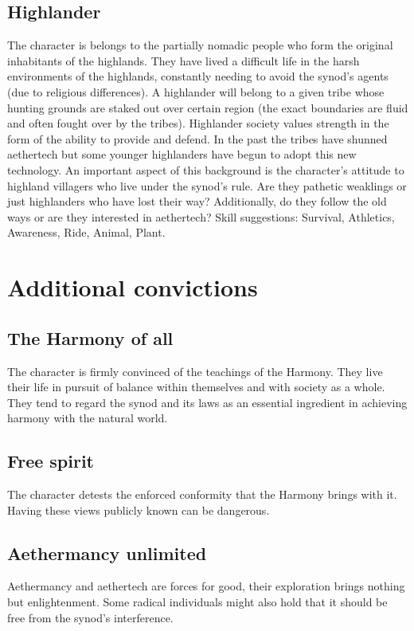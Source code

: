\documentclass[a4paper,11pt,oneside]{book}
\begin{document}
\subsection{Highlander}
The character is belongs to the partially nomadic people who form the original inhabitants of the highlands. They have lived a difficult life in the harsh environments of the highlands, constantly needing to avoid the synod's agents (due to religious differences). A highlander will belong to a given tribe whose hunting grounds are staked out over certain region (the exact boundaries are fluid and often fought over by the tribes). Highlander society values strength in the form of the ability to provide and defend. In the past the tribes have shunned aethertech but some younger highlanders have begun to adopt this new technology. An important aspect of this background is the character's attitude to highland villagers who live under the synod's rule. Are they pathetic weaklings or just highlanders who have lost their way? Additionally, do they follow the old ways or are they interested in aethertech? Skill suggestions: Survival, Athletics, Awareness, Ride, Animal, Plant.  


\section{Additional convictions}

\subsection{The Harmony of all}
The character is firmly convinced of the teachings of the Harmony. They live their life in pursuit of balance within themselves and with society as a whole. They tend to regard the synod and its laws as an essential ingredient in achieving harmony with the natural world.

\subsection{Free spirit}
The character detests the enforced conformity that the Harmony brings with it. Having these views publicly known can be dangerous. 

\subsection{Aethermancy unlimited}
Aethermancy and aethertech are forces for good, their exploration brings nothing but enlightenment. Some radical individuals might also hold that it should be free from the synod's interference. 
\end{document}
